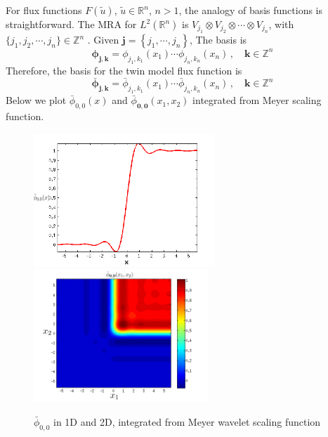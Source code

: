 \documentclass[a4paper,onecolumn]{article}
\theoremstyle{remark}
\begin{document}
\noindent For flux functions $F(\tilde{u})$, $\tilde{u}\in \mathbb{R}^n$, $n>1$, the analogy of
basis functions is straightforward.
The MRA for $L^2(\mathbb{R}^n)$ is 
$V_{j_1}\otimes V_{j_2}\otimes \cdots \otimes V_{j_n}$, with
$\{j_1,j_2,\cdots,j_n\}\in \mathbb{Z}^n$ \cite{wavelet mallat, Dijkema book}.
Given $\mathbf{j} = \left\{j_1,\cdots,j_n\right\}$, The basis is
\begin{equation}
   \mathbf{\phi}_{\mathbf{j},\mathbf{k}} = \phi_{j_1,k_1}(x_1)\cdots \phi_{j_n,k_n}(x_n)\,,
   \quad \mathbf{k}\in\mathbb{Z}^n
\end{equation}
Therefore, the basis for the twin model flux function is
\begin{equation}
   \bar{\mathbf{\phi}}_{\mathbf{j},\mathbf{k}} = \bar{\phi}_{j_1,k_1}(x_1)
   \cdots \bar{\phi}_{j_n,k_n}(x_n)\,,
   \quad \mathbf{k}\in\mathbb{Z}^n
   \label{basis flux wavelet}
\end{equation}
Below we plot $\bar{\phi}_{0,0}(x)$ and $\bar{\phi}_{\mathbf{0},\mathbf{0}}(x_1,x_2)$ 
integrated from Meyer scaling function.
\begin{figure}[H]\begin{center}
    \includegraphics[height=5cm]{basis.png}
    \includegraphics[height=5cm]{basis_2D.png}
\end{center}
\caption{$\bar{\phi}_{0,0}$ in 1D and 2D, integrated from Meyer wavelet scaling function}
\label{fig:Meyer Basis}
\end{figure}
\end{document}
